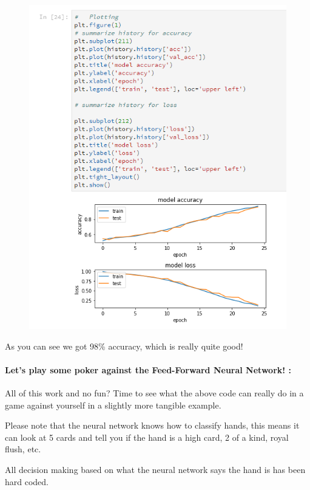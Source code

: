 \documentclass[11pt]{article}
\makeatletter
\def\maxwidth{\ifdim\Gin@nat@width>\linewidth\linewidth
    \else\Gin@nat@width\fi}
\let\Oldincludegraphics\includegraphics
\renewcommand{\includegraphics}[1]{\Oldincludegraphics[width=.8\maxwidth]{#1}}
\makeatother
\begin{document}
    \begin{figure}[htbp]
\centering
\includegraphics{ff_graph.png}
\caption{}
\end{figure}

    As you can see we got 98\% accuracy, which is really quite good!

    \paragraph{Let's play some poker against the Feed-Forward Neural
Network!
:}\label{lets-play-some-poker-against-the-feed-forward-neural-network}

    All of this work and no fun? Time to see what the above code can really
do in a game against yourself in a slightly more tangible example.

Please note that the neural network knows how to classify hands, this
means it can look at 5 cards and tell you if the hand is a high card, 2
of a kind, royal flush, etc.

All decision making based on what the neural network says the hand is
has been hard coded.
\end{document}
